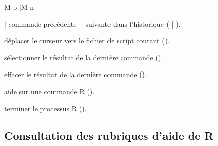 \begin{ttscript}{M-p |M-n}
\item[\code{M-p} | \code{M-n}] commande précédente~|~suivante
  dans l'historique \newline
  ( | \newline
  ).
\item[\code{C-c C-z}] déplacer le curseur vers le fichier de script
  courant \newline
  ().
\item[\code{M-h}] sélectionner le résultat de la dernière commande \newline
  ().
\item[\code{C-c C-o}] effacer le résultat de la dernière commande \newline
  ().
\item[\code{C-c C-v}] aide sur une commande R
  ().
\item[\code{C-c C-q}] terminer le processus R ().
\end{ttscript}

\subsection{Consultation des rubriques d'aide de R}
\label{sec:emacs+ess:commandes:aide}

